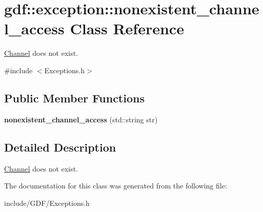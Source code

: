 \hypertarget{classgdf_1_1exception_1_1nonexistent__channel__access}{
\section{gdf::exception::nonexistent\_\-channel\_\-access Class Reference}
\label{classgdf_1_1exception_1_1nonexistent__channel__access}
}


\hyperlink{classgdf_1_1_channel}{Channel} does not exist.  




{\ttfamily \#include $<$Exceptions.h$>$}

\subsection*{Public Member Functions}
\begin{DoxyCompactItemize}
\item 
\hypertarget{classgdf_1_1exception_1_1nonexistent__channel__access_ab93aea48db58492eff7e768086cee264}{
{\bfseries nonexistent\_\-channel\_\-access} (std::string str)}
\label{classgdf_1_1exception_1_1nonexistent__channel__access_ab93aea48db58492eff7e768086cee264}

\end{DoxyCompactItemize}


\subsection{Detailed Description}
\hyperlink{classgdf_1_1_channel}{Channel} does not exist. 

The documentation for this class was generated from the following file:\begin{DoxyCompactItemize}
\item 
include/GDF/Exceptions.h\end{DoxyCompactItemize}
